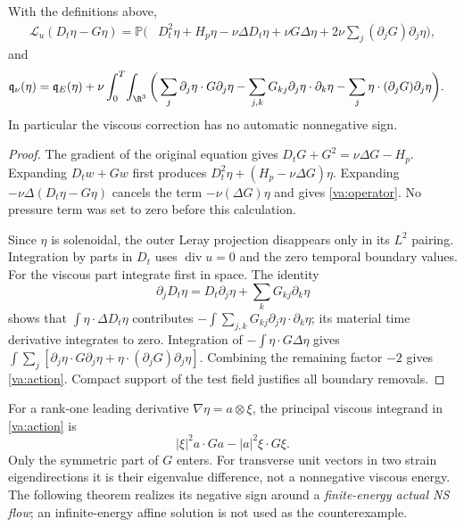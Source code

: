 \begin{proposition}
\label{va:identity}
With the definitions above,
\begin{align}
 \mathcal L_u(D_t\eta-G\eta)
 =\mathbb P\bigg(&D_t^2\eta+H_p\eta-\nu\Delta D_t\eta
       +\nu G\Delta\eta
       +2\nu\sum_j(\partial_jG)\partial_j\eta\bigg),
 \label{va:operator}
\end{align}
and
\begin{align}
 \mathfrak q_\nu(\eta)=\mathfrak q_E(\eta)+\nu\int_0^T\!\int_{\R^3}
 \bigg(&\sum_j\partial_j\eta\cdot G\partial_j\eta
 -\sum_{j,k}G_{kj}\partial_j\eta\cdot\partial_k\eta
 -\sum_j\eta\cdot(\partial_jG)\partial_j\eta\bigg).
 \label{va:action}
\end{align}
In particular the viscous correction has no automatic nonnegative sign.
\end{proposition}
\begin{proof}
The gradient of the original equation gives
$D_tG+G^2=\nu\Delta G-H_p$. Expanding $D_tw+Gw$ first produces
$D_t^2\eta+(H_p-\nu\Delta G)\eta$. Expanding
$-\nu\Delta(D_t\eta-G\eta)$ cancels the term
$-\nu(\Delta G)\eta$ and gives \eqref{va:operator}.
No pressure term was set to zero before this calculation.

Since $\eta$ is solenoidal, the outer Leray projection disappears only
in its $L^2$ pairing. Integration by parts in $D_t$ uses
$\operatorname{div}u=0$ and the zero temporal boundary values. For the
viscous part integrate first in space. The identity
\[
 \partial_jD_t\eta=D_t\partial_j\eta
                      +\sum_kG_{kj}\partial_k\eta
\]
shows that $\int\eta\cdot\Delta D_t\eta$ contributes
$-\int\sum_{j,k}G_{kj}\partial_j\eta\cdot\partial_k\eta$;
its material time derivative integrates to zero. Integration of
$-\int\eta\cdot G\Delta\eta$ gives
$\int\sum_j[\partial_j\eta\cdot G\partial_j\eta+
\eta\cdot(\partial_jG)\partial_j\eta]$.
Combining the remaining factor $-2$ gives \eqref{va:action}.
Compact support of the test field justifies all boundary removals.
\end{proof}

For a rank-one leading derivative $\nabla\eta=a\otimes\xi$, the principal
viscous integrand in \eqref{va:action} is
\begin{equation}\label{va:symbol}
 |\xi|^2a\cdot G a-|a|^2\xi\cdot G\xi.
\end{equation}
Only the symmetric part of $G$ enters. For transverse unit vectors in two
strain eigendirections it is their eigenvalue difference, not a nonnegative
viscous energy. The following theorem realizes its negative sign around a
\emph{finite-energy actual NS flow}; an infinite-energy affine solution is
not used as the counterexample.

